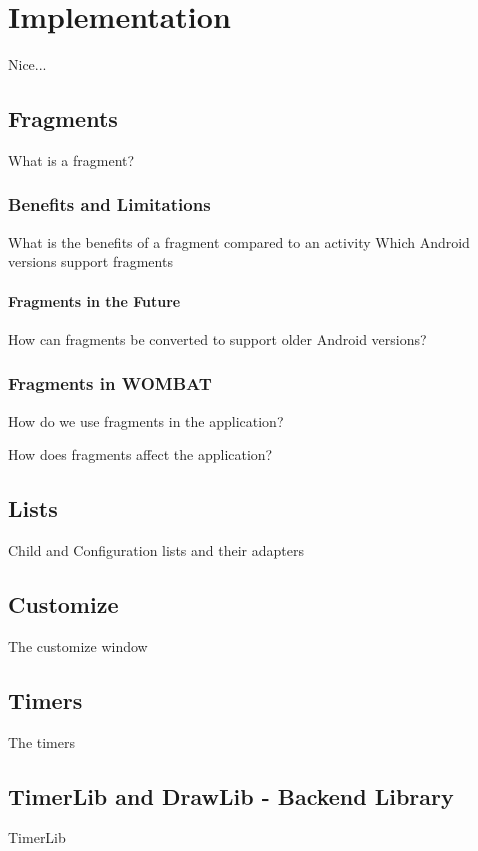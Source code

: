 \chapter{Implementation}
Nice...

\section{Fragments}

What is a fragment?

\subsection{Benefits and Limitations}
What is the benefits of a fragment compared to an activity
Which Android versions support fragments

\subsubsection*{Fragments in the Future}
How can fragments be converted to support older Android versions?

\subsection{Fragments in WOMBAT}
How do we use fragments in the application?

How does fragments affect the application?

\section{Lists}
Child and Configuration lists and their adapters

\section{Customize}
The customize window

\section{Timers}
The timers

\section{TimerLib and DrawLib - Backend Library}
TimerLib